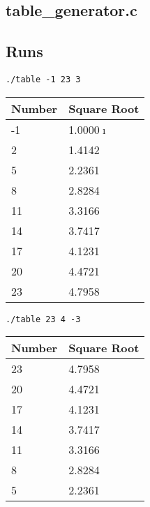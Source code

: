 \documentclass[letterpaper,oneside]{scrartcl}
\begin{document}
\subsection{table\_generator.c}

\subsection{Runs}
\begin{verbatim}./table -1 23 3\end{verbatim}
\begin{tabular}{l|l}
Number & Square Root \\ \hline
-1 & 1.0000$\imath$ \\ 
2 & 1.4142 \\ 
5 & 2.2361 \\ 
8 & 2.8284 \\ 
11 & 3.3166 \\ 
14 & 3.7417 \\ 
17 & 4.1231 \\ 
20 & 4.4721 \\ 
23 & 4.7958 \\ 
\end{tabular}

\begin{verbatim}./table 23 4 -3\end{verbatim}
\begin{tabular}{l|l}
Number & Square Root \\ \hline
23 & 4.7958 \\ 
20 & 4.4721 \\ 
17 & 4.1231 \\ 
14 & 3.7417 \\ 
11 & 3.3166 \\ 
8 & 2.8284 \\ 
5 & 2.2361 \\ 
\end{tabular}
\end{document}
